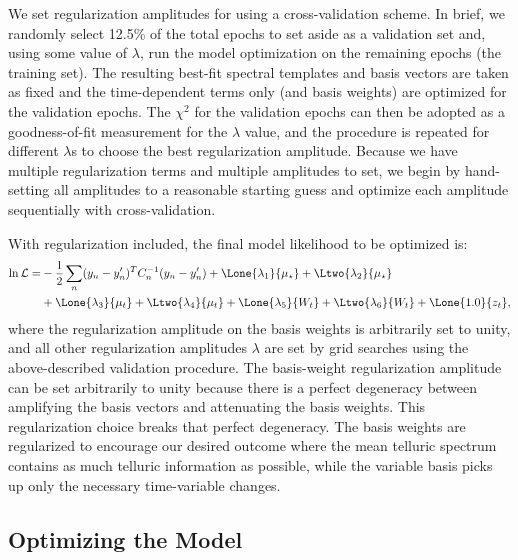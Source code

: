 \documentclass[modern]{aastex62}
\begin{document}
We set regularization amplitudes for \wobble using a cross-validation scheme. 
In brief, we randomly select 12.5\% of the total epochs to set aside as a validation set and, using some value of $\lambda$, run the model optimization on the remaining epochs (the training set).
The resulting best-fit spectral templates and basis vectors are taken as fixed and the time-dependent terms only (\RVs and basis weights) are optimized for the validation epochs. 
The $\chi^2$ for the validation epochs can then be adopted as a goodness-of-fit measurement for the $\lambda$ value, and the procedure is repeated for different $\lambda$s to choose the best regularization amplitude. 
Because we have multiple regularization terms and multiple amplitudes to set, we begin by hand-setting all amplitudes to a reasonable starting guess and optimize each amplitude sequentially with cross-validation.

With regularization included, the final model likelihood to be optimized is:
\begin{equation}
\begin{split}
\ln \mathcal{L} = & -\frac{1}{2} \sum_{n} (y_{n} - y'_{n})^T C_{n}^{-1} (y_{n}-y'_{n})  + \Lone{\lambda_1}{\mu_{\star}} + \Ltwo{\lambda_2}{\mu_{\star}} \\
 &  + \Lone{\lambda_3}{\mu_{t}} + \Ltwo{\lambda_4}{\mu_{t}}  + \Lone{\lambda_5}{W_t}  + \Ltwo{\lambda_6}{W_t} + \Lone{1.0}{z_t} ,
\end{split}
\end{equation}
where the regularization amplitude on the basis weights is arbitrarily set to unity, and all other regularization amplitudes $\lambda$ are set by grid searches using the above-described validation procedure.
The basis-weight regularization amplitude can be set arbitrarily to unity because there is a perfect degeneracy between amplifying the basis vectors and attenuating the basis weights.
This regularization choice breaks that perfect degeneracy.
The basis weights are regularized to encourage our desired outcome where the mean telluric spectrum contains as much telluric information as possible, while the variable basis picks up only the necessary time-variable changes.

\subsection{Optimizing the Model}
\label{s:optimizing}
\end{document}
